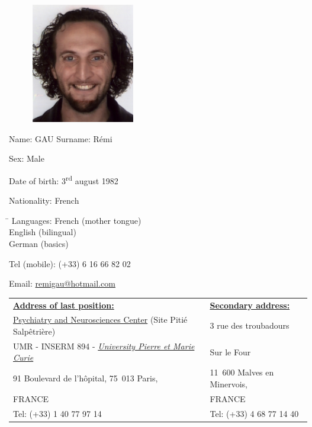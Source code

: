 \documentclass[a4paper,12pt,oneside]{letter}
\date{2011-04-12}
\begin{document}
\begin{figure}
\includegraphics[width=4.5cm]{ID0.jpg}
\end{figure}

Name: GAU \hspace{1cm} Surname: Rémi \hfill

Sex: Male

Date of birth: 3\textsuperscript{rd} august 1982

Nationality: French

\begin{tabbing}
\hspace{3cm}\=\kill
Languages:
 \> French (mother tongue)\\ 
 \> English (bilingual)\\ 
 \> German (basics)\\ 
\end{tabbing}

{Tel (mobile):} (+33) 6 16 66 82 02

{Email:} \href{mailto:remi\textunderscore gau@hotmail.com}{remi\textunderscore gau@hotmail.com}


\begin{tabular}[!h]
{p{11cm}||p{7cm}}

\underline{\textbf{Address of last position:}} 									& \underline{\textbf{Secondary address:}}\\ 
\href{http://www.broca.inserm.fr/site_cpn/new/index.php}{Psychiatry and Neurosciences Center} (Site Pitié Salpêtrière) 	& 3 rue des troubadours\\
UMR - INSERM 894 - \href{http://www.upmc.fr/}{\textit{University Pierre et Marie Curie}} 				& Sur le Four\\
91 Boulevard de l’hôpital, 75 013 Paris, 										& 11 600 Malves en Minervois,\\
FRANCE 															& FRANCE \\
{Tel:} (+33) 1 40 77 97 14 												& {Tel:} (+33) 4 68 77 14 40
\end{tabular}
\end{document}
